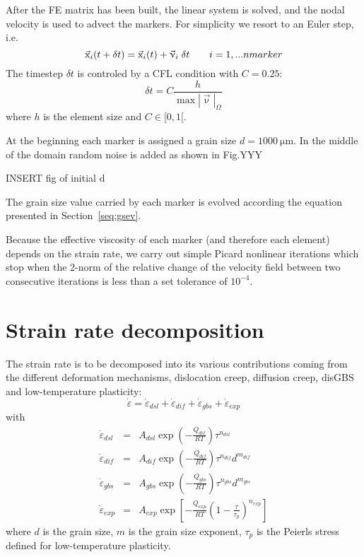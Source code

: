 \documentclass[a4paper]{article}
\begin{document}
After the FE matrix has been built, the linear system is solved, and the 
nodal velocity is used to advect the markers. 
For simplicity we resort to an Euler step, i.e.
\[
\vec{\text x}_i(t+\delta t) = \vec{\text x}_i(t) + \vec\upnu_i \; \delta t
\qquad
i=1,...nmarker 
\]
The timestep $\delta t$ is controled by a CFL condition with $C=0.25$:
\[
\delta t = C \frac{h}{\max |\vec\upnu|_\Omega}
\]
where $h$ is the element size and $C\in[0,1[$.



At the beginning each marker is assigned a grain size $d=1000~\si{\micro\meter}$.
In the middle of the domain random noise is added as shown in Fig.YYY
\begin{center}
INSERT fig of initial d
\end{center}
The grain size value carried by each marker is evolved according the 
equation presented in Section~\ref{seq:gsev}.

Because the effective viscosity of each marker (and therefore each element)
depends on the strain rate, we carry out simple Picard nonlinear iterations 
which stop when the 2-norm of the relative change of the velocity field between two consecutive 
iterations is less than a set tolerance of $10^{-4}$.


\section{Strain rate decomposition \label{sec:visc}}

The strain rate is to be decomposed into its various contributions 
coming from the different deformation mechanisms, dislocation creep,
diffusion creep, disGBS and low-temperature plasticity:
\[
\dot\varepsilon = \dot\varepsilon_{dsl} + \dot\varepsilon_{dif} + 
\dot\varepsilon_{gbs} + \dot\varepsilon_{exp} 
\]
with
\begin{eqnarray}
\dot{\varepsilon}_{dsl}&=&A_{dsl}\exp\left(-\frac{Q_{dsl}}{RT} \right) \tau^{n_{dsl}}  \\
\dot{\varepsilon}_{dif}&=&A_{dif}\exp\left(-\frac{Q_{dif}}{RT} \right) \tau^{n_{dif}} d^{m_{dif}} \\
\dot{\varepsilon}_{gbs}&=&A_{gbs}\exp\left(-\frac{Q_{gbs}}{RT} \right) \tau^{n_{gbs}} d^{m_{gbs}} \\
\dot{\varepsilon}_{exp}&=&A_{exp}\exp\left[-\frac{Q_{exp}}{RT} \left(1 -\frac{\tau}{\tau_p}\right)^{n_{exp}} \right]   
\end{eqnarray}
where $d$ is the grain size, $m$ is the grain size exponent, $\tau_p$ is the Peierls stress defined
for low-temperature plasticity.
\end{document}
